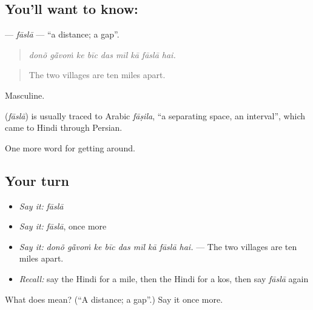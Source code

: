 \subsection*{You'll want to know: }
\textbf{} — \emph{fāslā} — \textquotedblleft{}a distance; a gap\textquotedblright{}.

\begin{quote}
        
\end{quote}

\begin{quote}
\emph{donõ gā̃voṁ ke bīc das mīl kā fāslā hai.}
\end{quote}

\begin{quote}
The two villages are ten miles apart.
\end{quote}

Masculine.

\begin{cousinweb}
\textbf{} (\emph{fāslā}) is usually traced to Arabic \emph{fāṣila}, \textquotedblleft{}a separating space, an interval\textquotedblright{}, which came to Hindi through Persian.
\end{cousinweb}

\begin{grammarlens}[title={What you've built}]
One more word for getting around.
\end{grammarlens}

\subsection*{Your turn}
\begin{itemize}
\raggedright
  \item \emph{Say it:} \emph{fāslā}
  \item \emph{Say it:} \emph{fāslā}, once more
  \item \emph{Say it:} \emph{donõ gā̃voṁ ke bīc das mīl kā fāslā hai.} — The two villages are ten miles apart.
  \item \emph{Recall:} say the Hindi for a mile, then the Hindi for a kos, then say \emph{fāslā} again
\end{itemize}

\begin{tcolorbox}[breakable,colback=teal!4,colframe=teal!35!black,title={Before you move on}]
What does  mean? (\textquotedblleft{}A distance; a gap\textquotedblright{}.) Say it once more.
\end{tcolorbox}
